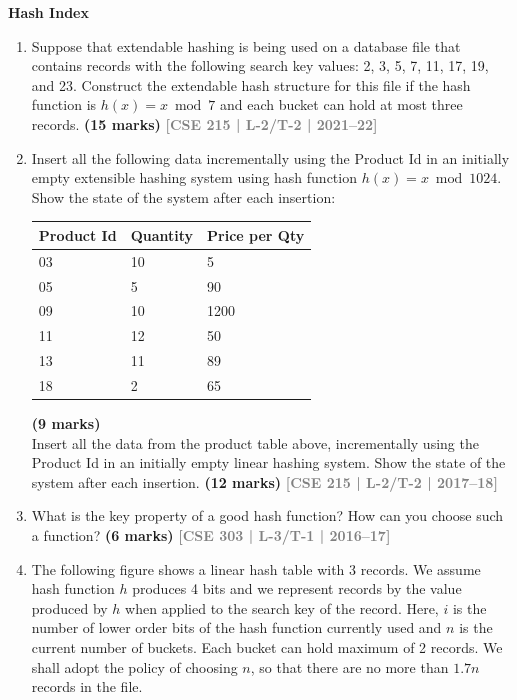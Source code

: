 \documentclass[12pt,a3paper]{article}
\newcommand{\yr}[1]{\hfill\textcolor{gray}{\small\textbf{[#1]}}}
\newcommand{\mk}[1]{\textcolor{orange!70!black}{\small\textbf{(#1 marks)}}}
\newcommand{\subtopic}[2]{%
  \vspace{10pt}
  \noindent\begin{tcolorbox}[colback=#1!8,colframe=#1,boxrule=0.6pt,arc=4pt,
    left=6pt,right=6pt,top=4pt,bottom=4pt]
    \small\bfseries\textcolor{#1}{#2}
  \end{tcolorbox}
  \vspace{2pt}
}
\begin{document}
\subtopic{cD}{Hash Index}
\label{sub:s5-hash}

\begin{enumerate}

\item Suppose that extendable hashing is being used on a database file that contains records with the following search key values: 2, 3, 5, 7, 11, 17, 19, and 23. Construct the extendable hash structure for this file if the hash function is $h(x) = x \bmod 7$ and each bucket can hold at most three records.
\mk{15} \yr{CSE 215 | L-2/T-2 | 2021--22}

\item Insert all the following data incrementally using the Product Id in an initially empty extensible hashing system using hash function $h(x) = x \bmod 1024$. Show the state of the system after each insertion:

\medskip
\begin{center}
\begin{tabular}{lll}
\toprule
\textbf{Product Id} & \textbf{Quantity} & \textbf{Price per Qty}\\
\midrule
03 & 10 & 5\\
05 & 5 & 90\\
09 & 10 & 1200\\
11 & 12 & 50\\
13 & 11 & 89\\
18 & 2 & 65\\
\bottomrule
\end{tabular}
\end{center}
\mk{9} \\

Insert all the data from the product table above, incrementally using the Product Id in an initially empty linear hashing system. Show the state of the system after each insertion.
\mk{12} \yr{CSE 215 | L-2/T-2 | 2017--18}

\item What is the key property of a good hash function? How can you choose such a function?
\mk{6} \yr{CSE 303 | L-3/T-1 | 2016--17}

\item The following figure shows a linear hash table with 3 records. We assume hash function $h$ produces 4 bits and we represent records by the value produced by $h$ when applied to the search key of the record. Here, $i$ is the number of lower order bits of the hash function currently used and $n$ is the current number of buckets. Each bucket can hold maximum of 2 records. We shall adopt the policy of choosing $n$, so that there are no more than $1.7 n$ records in the file.


\end{enumerate}
\end{document}
